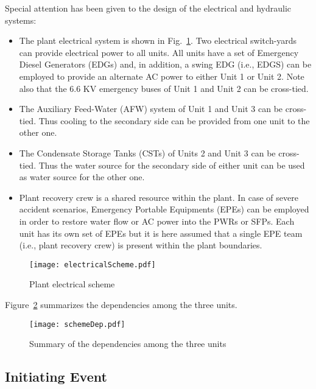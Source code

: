 Special attention has been given to the design of the electrical and hydraulic systems:
\begin{itemize}
  \item The plant electrical system is shown in Fig.~\ref{fig:electricalScheme}. Two 
        electrical switch-yards can provide electrical power to all units. All units 
        have a set of Emergency Diesel Generators (EDGs)  and, in addition, a swing 
        EDG (i.e., EDGS) can be employed to provide an alternate AC power to either
        Unit 1 or Unit 2. Note also that the 6.6 KV emergency buses of Unit 1 and 
        Unit 2 can be cross-tied.
  \item The Auxiliary Feed-Water (AFW) system of Unit 1 and Unit 3 can be cross-tied. 
        Thus cooling to the secondary side can be provided from one unit to the other one.
  \item The Condensate Storage Tanks (CSTs) of Units 2 and Unit 3 can be cross-tied. 
        Thus the water source  for the secondary side of either unit can be used as
        water source for the other one. 
  \item Plant recovery crew is a shared resource within the plant. In case of severe 
        accident scenarios, Emergency Portable Equipments (EPEs) can be employed in order
        to restore water flow or AC power into the PWRs or SFPs. Each unit has its own 
        set of EPEs but it is here assumed that a single EPE team (i.e., plant recovery 
        crew) is present within the plant boundaries.
\end{itemize}

\begin{figure}
    \centering
    \centerline{\texttt{[image: electricalScheme.pdf]}}
    \caption{Plant electrical scheme}
    \label{fig:electricalScheme}
\end{figure}

Figure~\ref{fig:schemeDep} summarizes the dependencies among the three units.

\begin{figure}
    \centering
    \centerline{\texttt{[image: schemeDep.pdf]}}
    \caption{Summary of the dependencies among the three units}
    \label{fig:schemeDep}
\end{figure}

\subsection{Initiating Event}

